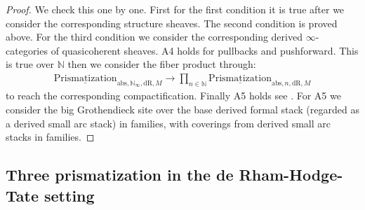 \documentclass[12pt]{article}
\theoremstyle{definition}
\begin{document}
\begin{proof}
We check this one by one. First for the first condition it is true after we consider the corresponding structure sheaves. The second condition is proved above. For the third condition we consider the corresponding derived $\infty$-categories of quasicoherent sheaves. A4 holds for pullbacks and pushforward. This is true over $\mathbb{N}$ then we consider the fiber product through:
\begin{align}
{\underline{\mathrm{Prismatization}}}_{\mathrm{abs},\mathbb{N}_\infty,\mathrm{dR},M}\rightarrow  \prod_{n\in \mathbb{N}} {\underline{\mathrm{Prismatization}}}_{\mathrm{abs},n,\mathrm{dR},M}
\end{align}
to reach the corresponding compactification. Finally A5 holds see \cite[Chapter 4, in particular 4.7, 4.8, 4.9, 4.10]{3A}. For A5 we consider the big Grothendieck site over the base derived formal stack (regarded as a derived small arc stack) in families, with coverings from derived small arc stacks in families.
\end{proof}





\subsection{Three prismatization in the de Rham-Hodge-Tate setting}
\end{document}
